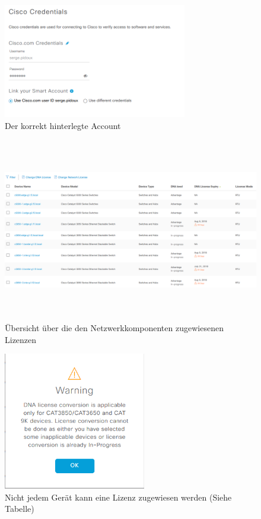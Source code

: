 \begin{figure}[H]
	\centering
	\includegraphics[height=5cm]{img/LicenceManager_002.png}
	\caption{Der korrekt hinterlegte Account}
	\label{fig:dna-center-licence-5}
\end{figure}

\begin{figure}[H]
	\centering
	\includegraphics[height=8cm]{img/LicenceManager_003.png}
	\caption{Übersicht über die den Netzwerkkomponenten zugewiesenen Lizenzen}
	\label{fig:dna-center-licence-6}
\end{figure}

\begin{figure}[H]
	\centering
	\includegraphics[height=6cm]{img/LicenceManager_004.png}
	\caption{Nicht jedem Gerät kann eine Lizenz zugewiesen werden (Siehe Tabelle)}
	\label{fig:dna-center-licence-7}
\end{figure}

